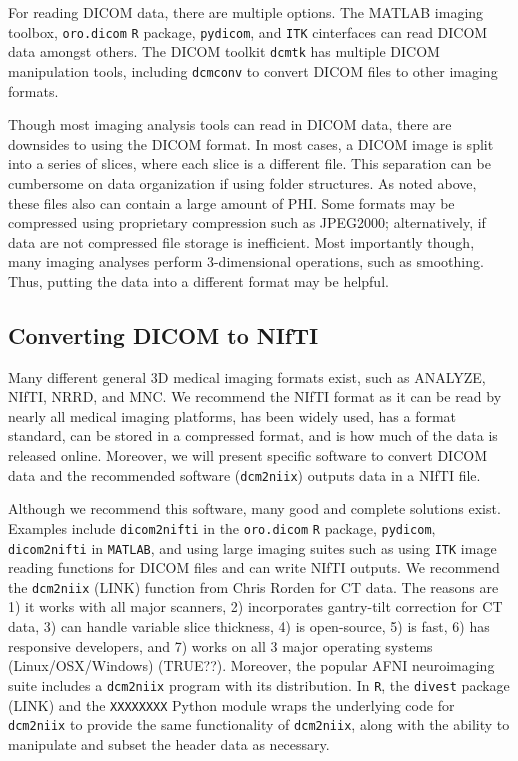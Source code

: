 \documentclass[]{elsarticle} %
\begin{document}
For reading DICOM data, there are multiple options. The MATLAB imaging
toolbox, \texttt{oro.dicom} \texttt{R} package, \texttt{pydicom}, and
\texttt{ITK} cinterfaces can read DICOM data amongst others. The DICOM
toolkit \texttt{dcmtk} has multiple DICOM manipulation tools, including
\texttt{dcmconv} to convert DICOM files to other imaging formats.

Though most imaging analysis tools can read in DICOM data, there are
downsides to using the DICOM format. In most cases, a DICOM image is
split into a series of slices, where each slice is a different file.
This separation can be cumbersome on data organization if using folder
structures. As noted above, these files also can contain a large amount
of PHI. Some formats may be compressed using proprietary compression
such as JPEG2000; alternatively, if data are not compressed file storage
is inefficient. Most importantly though, many imaging analyses perform
3-dimensional operations, such as smoothing. Thus, putting the data into
a different format may be helpful.

\hypertarget{converting-dicom-to-nifti}{%
\subsection{Converting DICOM to NIfTI}\label{converting-dicom-to-nifti}}

Many different general 3D medical imaging formats exist, such as
ANALYZE, NIfTI, NRRD, and MNC. We recommend the NIfTI format as it can
be read by nearly all medical imaging platforms, has been widely used,
has a format standard, can be stored in a compressed format, and is how
much of the data is released online. Moreover, we will present specific
software to convert DICOM data and the recommended software
(\texttt{dcm2niix}) outputs data in a NIfTI file.

Although we recommend this software, many good and complete solutions
exist. Examples include \texttt{dicom2nifti} in the \texttt{oro.dicom}
\texttt{R} package, \texttt{pydicom}, \texttt{dicom2nifti} in
\texttt{MATLAB}, and using large imaging suites such as using
\texttt{ITK} image reading functions for DICOM files and can write NIfTI
outputs. We recommend the \texttt{dcm2niix} (LINK) function from Chris
Rorden for CT data. The reasons are 1) it works with all major scanners,
2) incorporates gantry-tilt correction for CT data, 3) can handle
variable slice thickness, 4) is open-source, 5) is fast, 6) has
responsive developers, and 7) works on all 3 major operating systems
(Linux/OSX/Windows) (TRUE??). Moreover, the popular AFNI neuroimaging
suite includes a \texttt{dcm2niix} program with its distribution. In
\texttt{R}, the \texttt{divest} package (LINK) and the \texttt{XXXXXXXX}
Python module wraps the underlying code for \texttt{dcm2niix} to provide
the same functionality of \texttt{dcm2niix}, along with the ability to
manipulate and subset the header data as necessary.
\end{document}
